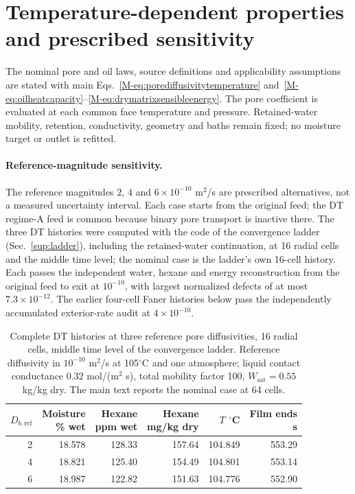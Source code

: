 \section{Temperature-dependent properties and prescribed sensitivity}
\label{sup:temperatureproperties}
The nominal pore and oil laws, source definitions and applicability
assumptions are stated with main Eqs.~\ref*{M-eq:porediffusivitytemperature}
and~\ref*{M-eq:oilheatcapacity}--\ref*{M-eq:drymatrixsensibleenergy}.
The pore coefficient is evaluated at each common face temperature and
pressure. Retained-water mobility, retention, conductivity, geometry and
baths remain fixed; no moisture target or outlet is refitted.

\paragraph{Reference-magnitude sensitivity.}
The reference magnitudes $2$, $4$ and $6\times10^{-10}$ m$^2$/s are
prescribed alternatives, not a measured uncertainty interval. Each case
starts from the original feed; the DT regime-A feed is common because
binary pore transport is inactive there. The three DT histories were
computed with the code of the convergence ladder (Sec.~\ref{sup:ladder}),
including the retained-water continuation, at 16 radial cells and the
middle time level; the nominal case is the ladder's own 16-cell history.
Each passes the independent water, hexane and energy reconstruction from
the original feed to exit at $10^{-10}$, with largest normalized defects
of at most $7.3\times10^{-12}$. The earlier four-cell Faner histories below
pass the independently accumulated exterior-rate audit at
$4\times10^{-10}$.

\begin{table}[htbp]\centering\small
\caption{Complete DT histories at three reference pore diffusivities,
16 radial cells, middle time level of the convergence ladder.
Reference diffusivity in $10^{-10}$ m$^2$/s at 105$^\circ$C and one atmosphere;
liquid contact conductance 0.32 mol/(m$^2$ s), total mobility factor 100,
$W_{\mathrm{sat}}=0.55$ kg/kg dry. The main text reports the nominal case
at 64 cells.}
\label{tab:temperatureproperties:dt}
\begin{tabular}{@{}rrrrrr@{}}\toprule
$D_{b,\mathrm{ref}}$ & \shortstack{Moisture\\\% wet} & \shortstack{Hexane\\ppm wet} & \shortstack{Hexane\\mg/kg dry} & \shortstack{$T$\\$^\circ$C} & \shortstack{Film ends\\s}\\\midrule
2 & 18.578 & 128.33 & 157.64 & 104.849 & 553.29\\
4 & 18.821 & 125.40 & 154.49 & 104.801 & 553.14\\
6 & 18.987 & 122.82 & 151.63 & 104.776 & 552.90\\
\bottomrule\end{tabular}\end{table}


